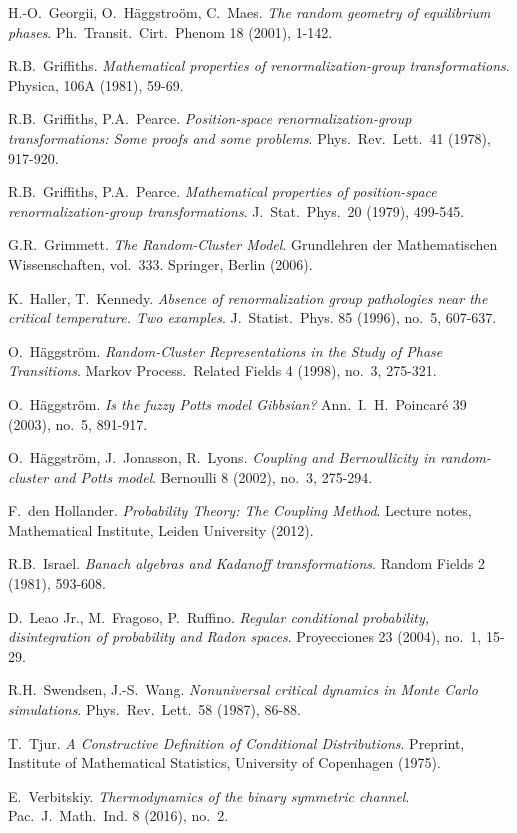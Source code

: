 \documentclass[12pt]{article}
\newcommand{\1}{\mathbbm{1}}
\newcommand{\5}{\vspace{0.5cm}}
\theoremstyle{definition}
\begin{document}
\begin{thebibliography}{++}
 H.-O.~Georgii, O.~H\"aggstro\"om, C.~Maes. \textit{The random geometry of equilibrium phases}. Ph.~Transit.~Cirt.~Phenom 18 (2001), 1-142.

 R.B.~Griffiths. \textit{Mathematical properties of renormalization-group transformations}. Physica, 106A (1981), 59-69.

 R.B.~Griffiths, P.A.~Pearce. \textit{Position-space renormalization-group transformations: Some proofs and some problems}. Phys.~Rev.~Lett.~41 (1978), 917-920.

 R.B.~Griffiths, P.A.~Pearce. \textit{Mathematical properties of position-space renormalization-group transformations}. J.~Stat.~Phys.~20 (1979), 499-545.

 G.R.~Grimmett. \textit{The Random-Cluster Model}. Grundlehren der Mathematischen Wissenschaften, vol.~333. Springer, Berlin (2006).

 K.~Haller, T.~Kennedy. \textit{Absence of renormalization group pathologies near the critical temperature. Two examples}. J.~Statist.~Phys. 85 (1996), no.~5, 607-637.

 O.~H\"aggstr\"om. \textit{Random-Cluster Representations in the Study of Phase Transitions}. Markov Process.~Related Fields 4 (1998), no.~3, 275-321.

 O.~H\"aggstr\"om. \textit{Is the fuzzy Potts model Gibbsian?} Ann.~I.~H.~Poincar\'e 39 (2003), no.~5, 891-917.

 O.~H\"aggstr\"om, J.~Jonasson, R.~Lyons. \textit{Coupling and Bernoullicity in random-cluster and Potts model}. Bernoulli 8 (2002), no.~3, 275-294.

 F.~den Hollander. \textit{Probability Theory: The Coupling Method}. Lecture notes, Mathematical Institute, Leiden University (2012).

 R.B.~Israel. \textit{Banach algebras and Kadanoff transformations}. Random Fields 2 (1981), 593-608.

 D.~Leao Jr., M.~Fragoso, P.~Ruffino. \textit{Regular conditional probability, disintegration of probability and Radon spaces}. Proyecciones 23 (2004), no.~1, 15-29.

 R.H.~Swendsen, J.-S.~Wang. \textit{Nonuniversal critical dynamics in Monte Carlo simulations}. Phys.~Rev.~Lett.~58 (1987), 86-88.

 T.~Tjur. \textit{A Constructive Definition of Conditional Distributions}. Preprint, Institute of Mathematical Statistics, University of Copenhagen (1975).

 E.~Verbitskiy. \textit{Thermodynamics of the binary symmetric channel}. Pac.~J.~Math.~Ind. 8 (2016), no.~2.

\end{thebibliography}

\end{document}
